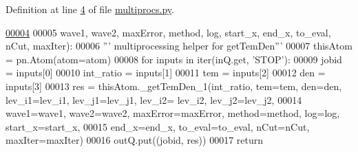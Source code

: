 Definition at line \hyperlink{multiprocs_8py_source_l00004}{4} of file \hyperlink{multiprocs_8py_source}{multiprocs.\-py}.


\begin{DoxyCode}
\hypertarget{namespacepyneb_1_1utils_1_1multiprocs_l00004}{}\hyperlink{namespacepyneb_1_1utils_1_1multiprocs_a723f731c93c5b93828616060537f65ed}{00004} 
00005          wave1, wave2, maxError, method, log, start\_x, end\_x, to\_eval, nCut, maxIter):
00006     \textcolor{stringliteral}{''' multiprocessing helper for getTemDen'''}
00007     thisAtom = pn.Atom(atom=atom)
00008     \textcolor{keywordflow}{for} inputs \textcolor{keywordflow}{in} iter(inQ.get, \textcolor{stringliteral}{'STOP'}):
00009         jobid = inputs[0]
00010         int\_ratio = inputs[1]
00011         tem = inputs[2]
00012         den = inputs[3]
00013         res = thisAtom.\_getTemDen\_1(int\_ratio, tem=tem, den=den, lev\_i1=lev\_i1, lev\_j1=lev\_j1, lev\_i2=
      lev\_i2, lev\_j2=lev\_j2,
00014                   wave1=wave1, wave2=wave2, maxError=maxError, method=method, log=log, start\_x=start\_x, 
00015                   end\_x=end\_x, to\_eval=to\_eval, nCut=nCut, maxIter=maxIter)
00016         outQ.put((jobid, res))
00017     \textcolor{keywordflow}{return}
\end{DoxyCode}
